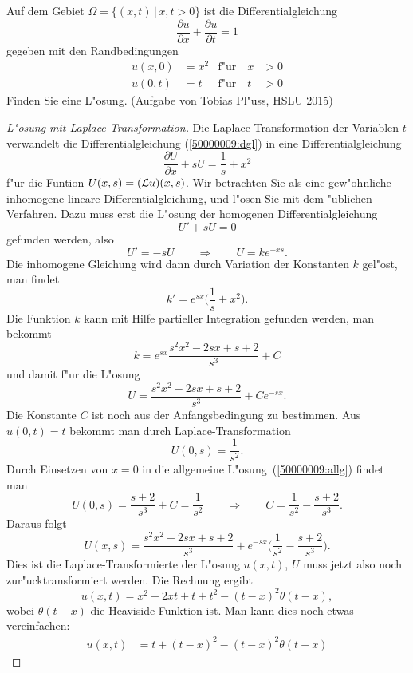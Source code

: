 Auf dem Gebiet $\Omega = \{(x,t)\,|\, x,t > 0\}$ ist die Differentialgleichung
\begin{equation}
\frac{\partial u}{\partial x}
+
\frac{\partial u}{\partial t}
=
1
\label{50000009:dgl}
\end{equation}
gegeben mit den Randbedingungen
\begin{equation}
\begin{aligned}
u(x,0)&=x^2&\text{f"ur}\quad x&>0\\
u(0,t)&=t  &\text{f"ur}\quad t&>0
\end{aligned}
\end{equation}
Finden Sie eine L"osung.
(Aufgabe von Tobias Pl"uss, HSLU 2015)

\begin{proof}[L"osung mit Laplace-Transformation]
Die Laplace-Transformation der Variablen $t$ verwandelt die
Differentialgleichung (\ref{50000009:dgl}) in eine Differentialgleichung
\[
\frac{\partial U}{\partial x}+sU=\frac1s+x^2
\]
f"ur die Funtion $U(x,s)=({\cal L}u)(x,s)$. Wir betrachten Sie
als eine gew"ohnliche inhomogene lineare Differentialgleichung,
und l"osen Sie mit dem "ublichen Verfahren. Dazu muss erst die L"osung 
der homogenen Differentialgleichung
\[
U' + sU = 0
\]
gefunden werden, also
\[
U'=-sU
\qquad\Rightarrow\qquad
U=ke^{-xs}.
\]
Die inhomogene Gleichung wird dann durch Variation der Konstanten $k$ gel"ost,
man findet
\[
k' = e^{sx}\biggl(\frac1s+x^2\biggr).
\]
Die Funktion $k$ kann mit Hilfe partieller Integration gefunden werden,
man bekommt
\[
k=e^{sx}\frac{s^2x^2-2sx+s+2}{s^3}+C
\]
und damit f"ur die L"osung
\begin{equation}
U=\frac{s^2x^2-2sx+s+2}{s^3}+Ce^{-sx}.
\label{50000009:allg}
\end{equation}
Die Konstante $C$ ist noch aus der Anfangsbedingung zu bestimmen. Aus
$u(0,t)=t$ bekommt man durch Laplace-Transformation
\[
U(0,s)=\frac1{s^2}.
\]
Durch Einsetzen von $x=0$ in die allgemeine L"osung~(\ref{50000009:allg})
findet man
\[
U(0,s)=\frac{s+2}{s^3}+C=\frac1{s^2}
\qquad\Rightarrow\qquad
C= \frac1{s^2} - \frac{s+2}{s^3}.
\]
Daraus folgt
\[
U(x,s)=\frac{s^2x^2-2sx+s+2}{s^3}
+
e^{-sx}\biggl(\frac1{s^2}-\frac{s+2}{s^3}\biggr).
\]
Dies ist die Laplace-Transformierte der L"osung $u(x,t)$, $U$ muss jetzt
also noch zur"ucktransformiert werden.
Die Rechnung ergibt
\[
u(x,t)=x^2-2xt+t+t^2-(t-x)^2\theta(t-x),
\]
wobei $\theta(t-x)$ die Heaviside-Funktion ist.
Man kann dies noch etwas vereinfachen:
\begin{align}
u(x,t)
&=
t+(t-x)^2 -(t-x)^2\theta(t-x)

\end{align}
\end{proof}

